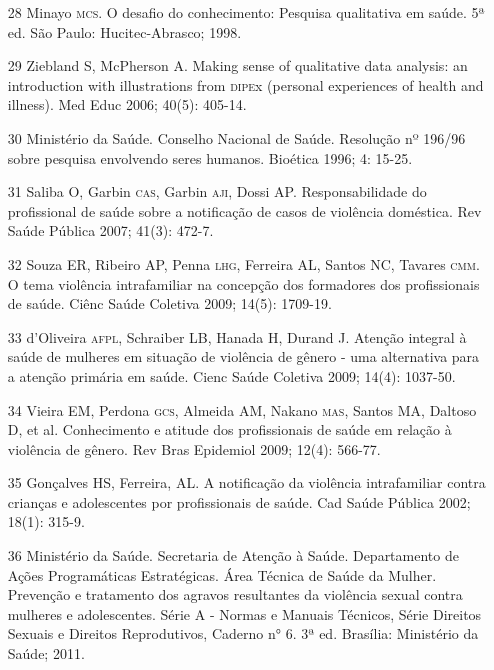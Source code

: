 \documentclass{article}
\begin{document}
\begin{itemize}
\item[28] Minayo \textsc{mcs}. O desafio do conhecimento: Pesquisa qualitativa em
saúde. 5ª ed. São Paulo: Hucitec-Abrasco; 1998.

\item[29] Ziebland S, McPherson A. Making sense of qualitative data
analysis: an introduction with illustrations from \textsc{dipe}x (personal experiences of
health and illness). Med Educ 2006; 40(5): 405-14.

\item[30] Ministério da Saúde. Conselho Nacional de Saúde. Resolução nº
196/96 sobre pesquisa envolvendo seres humanos. Bioética 1996; 4: 15-25.

\item[31] Saliba O, Garbin \textsc{cas}, Garbin \textsc{aji}, Dossi AP. Responsabilidade do
profissional de saúde sobre a notificação de casos de violência doméstica. Rev
Saúde Pública 2007; 41(3): 472-7.

\item[32] Souza ER, Ribeiro AP, Penna \textsc{lhg}, Ferreira AL, Santos NC, Tavares
\textsc{cmm}. O tema violência intrafamiliar na concepção dos formadores dos
profissionais de saúde. Ciênc Saúde Coletiva 2009; 14(5): 1709-19.

\item[33] d'Oliveira \textsc{afpl}, Schraiber LB, Hanada H, Durand J. Atenção
integral à saúde de mulheres em situação de violência de gênero - uma
alternativa para a atenção primária em saúde. Cienc Saúde Coletiva 2009; 14(4):
1037-50.

\item[34] Vieira EM, Perdona \textsc{gcs}, Almeida AM, Nakano \textsc{mas}, Santos MA, Daltoso
D, et al. Conhecimento e atitude dos profissionais de saúde em relação à
violência de gênero. Rev Bras Epidemiol 2009; 12(4): 566-77.

\item[35] Gonçalves HS, Ferreira, AL. A notificação da violência
intrafamiliar contra crianças e adolescentes por profissionais de saúde. Cad
Saúde Pública 2002; 18(1): 315-9.

\item[36] Ministério da Saúde. Secretaria de Atenção à Saúde. Departamento
de Ações Programáticas Estratégicas. Área Técnica de Saúde da Mulher. Prevenção
e tratamento dos agravos resultantes da violência sexual contra mulheres e
adolescentes. Série A - Normas e Manuais Técnicos, Série Direitos Sexuais e
Direitos Reprodutivos, Caderno n° 6. 3ª ed. Brasília: Ministério da Saúde; 2011.


\end{itemize}
\end{document}
